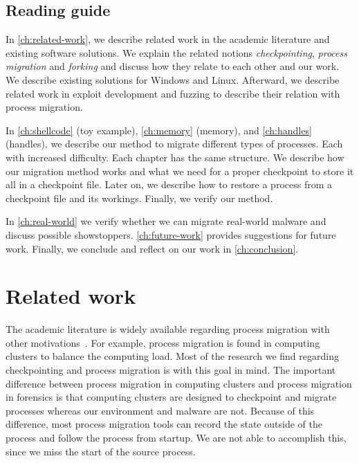 \documentclass[a4paper, 11pt, english]{report}
\begin{document}
\section{Reading guide}
\label{sec:reading-guide}

In \autoref{ch:related-work}, we describe related work in the academic literature and existing software solutions.
We explain the related notions \textit{checkpointing}, \textit{process migration} and \textit{forking} and discuss how they relate to each other and our work. We describe existing solutions for Windows and Linux. 
Afterward, we describe related work in exploit development and fuzzing to describe their relation with process migration.

In \autoref{ch:shellcode} (toy example), \autoref{ch:memory} (memory), and \autoref{ch:handles} (handles), we describe our method to migrate different types of processes. Each with increased difficulty. Each chapter has the same structure. We describe how our migration method works and what we need for a proper checkpoint to store it all in a checkpoint file.
Later on, we describe how to restore a process from a checkpoint file and its workings. Finally, we verify our method.

In \autoref{ch:real-world} we verify whether we can migrate real-world malware and discuss possible showstoppers.
\autoref{ch:future-work} provides suggestions for future work. Finally, we conclude and reflect on our work in \autoref{ch:conclusion}. 


\chapter{Related work}
\label{ch:related-work}

The academic literature is widely available regarding process migration with other motivations~\cite{huang1998nt-swift}\cite{ansel2009dmtcp}\cite{barak1998mosix}\cite{khidhir2012migrationwin7}. For example, process migration is found in computing clusters to balance the computing load. Most of the research we find regarding checkpointing and process migration is with this goal in mind. The important difference between process migration in computing clusters and process migration in forensics is that computing clusters are designed to checkpoint and migrate processes whereas our environment and malware are not. Because of this difference, most process migration tools can record the state outside of the process and follow the process from startup. We are not able to accomplish this, since we miss the start of the source process.
\end{document}
